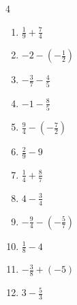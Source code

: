 \begin{multicols}{4}
\begin{enumerate}

  \item $\displaystyle \frac{1}{9} + \frac{7}{4}$


  \item $\displaystyle -2 - \left(-\frac{1}{2}\right)$


  \item $\displaystyle -\frac{3}{7} - \frac{4}{5}$


  \item $\displaystyle -1 - \frac{8}{5}$


  \item $\displaystyle \frac{9}{4} - \left(-\frac{7}{2}\right)$


  \item $\displaystyle \frac{2}{9} - 9$


  \item $\displaystyle \frac{1}{4} + \frac{8}{7}$


  \item $\displaystyle 4 - \frac{3}{4}$


  \item $\displaystyle -\frac{9}{4} - \left(-\frac{5}{7}\right)$


\columnbreak %

  \item $\displaystyle \frac{1}{8} - 4$


  \item $\displaystyle -\frac{3}{8} + \left(-5\right)$


  \item $\displaystyle 3 - \frac{5}{3}$


\end{enumerate}
\end{multicols}
